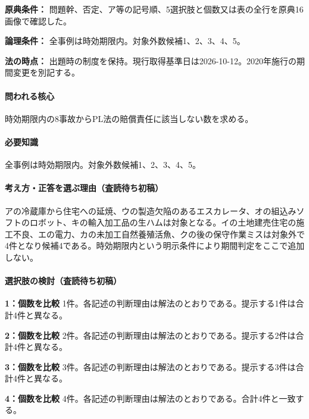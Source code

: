 \noindent\textbf{原典条件：} 問題幹、否定、ア等の記号順、5選択肢と個数又は表の全行を原典16画像で確認した。\par

\noindent\textbf{論理条件：} 全事例は時効期限内。対象外数候補1、2、3、4、5。\par

\noindent\textbf{法の時点：} 出題時の制度を保持。現行取得基準日は2026-10-12。2020年施行の期間変更を別記する。\par

\paragraph{問われる核心} 時効期限内の8事故からPL法の賠償責任に該当しない数を求める。

\paragraph{必要知識} 全事例は時効期限内。対象外数候補1、2、3、4、5。

\paragraph{考え方・正答を選ぶ理由（査読待ち初稿）} アの冷蔵庫から住宅への延焼、ウの製造欠陥のあるエスカレータ、オの組込みソフトのロボット、キの輸入加工品の生ハムは対象となる。イの土地建売住宅の施工不良、エの電力、カの未加工自然養殖活魚、クの後の保守作業ミスは対象外で4件となり候補4である。時効期限内という明示条件により期間判定をここで追加しない。

\paragraph{選択肢の検討（査読待ち初稿）}\mbox{}\par

\noindent\textbf{1：個数を比較} 1件。各記述の判断理由は解法のとおりである。提示する1件は合計4件と異なる。\par

\noindent\textbf{2：個数を比較} 2件。各記述の判断理由は解法のとおりである。提示する2件は合計4件と異なる。\par

\noindent\textbf{3：個数を比較} 3件。各記述の判断理由は解法のとおりである。提示する3件は合計4件と異なる。\par

\noindent\textbf{4：個数を比較} 4件。各記述の判断理由は解法のとおりである。合計4件と一致する。\par

